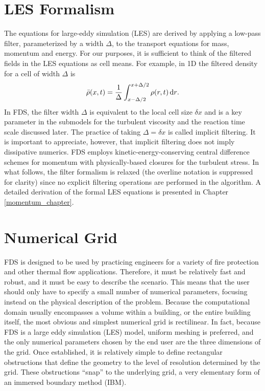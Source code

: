 \section{LES Formalism}
\label{filteredfields}

The equations for large-eddy simulation (LES) are derived by applying a low-pass filter, parameterized by a width $\Delta$, to the transport equations for mass, momentum and energy.  For our purposes, it is sufficient to think of the filtered fields in the LES equations as cell means.  For example, in 1D the filtered density for a cell of width $\Delta$ is
\begin{equation}
\label{eqn_filtered_density}
\bar{\rho}(x,t) = \frac{1}{\Delta}\int_{x-\Delta/2}^{x+\Delta/2} \rho(r,t) \,\mathrm{d} r \mbox{.}
\end{equation}
In FDS, the filter width $\Delta$ is equivalent to the local cell size $\delta x$ and is a key parameter in the submodels for the turbulent viscosity and the reaction time scale discussed later.  The practice of taking $\Delta = \delta x$ is called implicit filtering.  It is important to appreciate, however, that implicit filtering does not imply dissipative numerics.  FDS employs kinetic-energy-conserving central difference schemes for momentum with physically-based closures for the turbulent stress.  In what follows, the filter formalism is relaxed (the overline notation is suppressed for clarity) since no explicit filtering operations are performed in the algorithm.  A detailed derivation of the formal LES equations is presented in Chapter \ref{momentum_chapter}.

\section{Numerical Grid}
\label{govequations}

FDS is designed to be used by practicing engineers for a variety of fire protection and other thermal flow applications.
Therefore, it must be relatively fast and robust, and it must be easy to describe the scenario. This means that the user
should only have to specify a small number of numerical parameters, focusing instead on the physical description of the
problem. Because the
computational domain usually encompasses a volume within a building, or the entire building itself, the
most obvious and simplest numerical grid is rectilinear.
In fact, because FDS is a large eddy simulation (LES) model, uniform meshing is
preferred, and the only numerical parameters chosen by the end user are the three dimensions of the grid. Once established, it
is relatively simple to define rectangular obstructions that define the geometry to the level of resolution determined by the
grid. These obstructions ``snap'' to the underlying grid, a very elementary form of an immersed boundary method (IBM).

